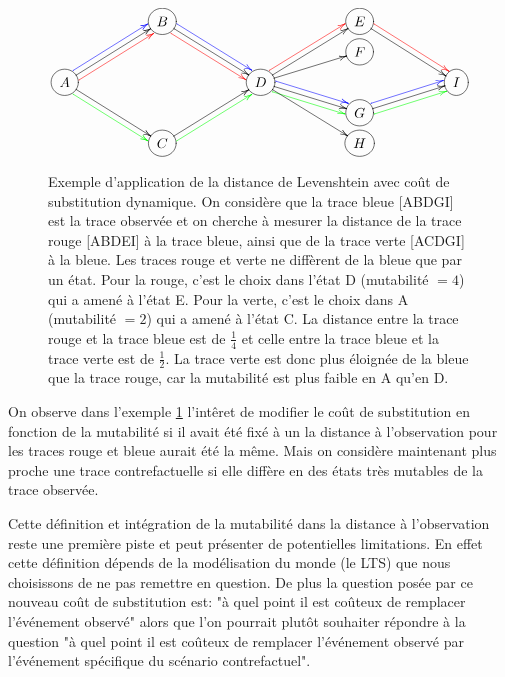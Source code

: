 \documentclass[11pt]{extarticle}
\begin{document}
\begin{figure}[h!]
    \centering
    \[
        \xymatrix @R=0.3em @C=5em{
                & *++[o][F-]{B} \ar[ddr] \ar@[red]@{->}@< -4pt>[ddr] \ar@[blue]@{->}@< +4pt>[rdd]& & *++[o][F-]{E} \ar[rdd] \ar@[red]@{->}@< +4pt>[rdd]& \\
                & & & *++[o][F-]{F} & \\
            *++[o][F-]{A} \ar[ruu] \ar@[blue]@{->}@< +4pt>[ruu] \ar[rdd] \ar@[green]@{->}@< -4pt>[ddr] \ar@[red]@{->}@< -4pt>[ruu] & & *++[o][F-]{D} \ar[ruu] \ar[ru] \ar[rd] \ar@[blue]@{->}@< +4pt>[rd] \ar@[green]@{->}@< -4pt>[dr] \ar[rdd] \ar@[red]@{->}@< +4pt>[ruu]& & *++[o][F-]{I} \\
                & & & *++[o][F-]{G} \ar[ru] \ar@[blue]@{->}@< +4pt>[ru] \ar@[green]@{->}@< -4pt>[ru]& \\
                & *++[o][F-]{C} \ar[ruu] \ar@[green]@{->}@< -4pt>[ruu] & & *++[o][F-]{H} &
        }
    \]
    \captionsetup{width = 0.8\textwidth}

    \caption{Exemple d'application de la distance de Levenshtein avec coût de substitution dynamique. On considère que la trace bleue [ABDGI] est la trace observée et on cherche à mesurer la distance de la trace rouge [ABDEI] à la trace bleue, ainsi que de la trace verte [ACDGI] à la bleue. Les traces rouge et verte ne diffèrent de la bleue que par un état. Pour la rouge, c'est le choix dans l'état D (mutabilité $= 4$) qui a amené à l'état E. Pour la verte, c'est le choix dans A (mutabilité $= 2$) qui a amené à l'état C. La distance entre la trace rouge et la trace bleue est de $\frac{1}{4}$ et celle entre la trace bleue et la trace verte est de $\frac{1}{2}$. La trace verte est donc plus éloignée de la bleue que la trace rouge, car la mutabilité est plus faible en A qu'en D.}
    \label{cout_sub}
\end{figure}

On observe dans l'exemple \ref{cout_sub} l'intêret de modifier le coût de substitution en fonction de la mutabilité si il avait été fixé à un la distance à l'observation pour les traces rouge et bleue aurait été la même. Mais on considère maintenant plus proche une trace contrefactuelle si elle diffère en des états très mutables de la trace observée.

Cette définition et intégration de la mutabilité dans la distance à l'observation reste une première piste et peut présenter de potentielles limitations. En effet cette définition dépends de la modélisation du monde (le LTS) que nous choisissons de ne pas remettre en question. De plus la question posée par ce nouveau coût de substitution est: "à quel point il est coûteux de remplacer l'événement observé" alors que l'on pourrait plutôt souhaiter répondre à la question "à quel point il est coûteux de remplacer l'événement observé par l'événement spécifique du scénario contrefactuel".
\end{document}
